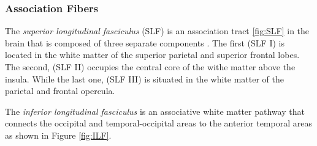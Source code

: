    \subsubsection*{Association Fibers}
   The \emph{superior longitudinal fasciculus} (SLF) is an association tract \ref{fig:SLF} in the brain that is composed of three separate components . The first (SLF I) is located in the white matter of the superior parietal and superior frontal lobes. The second, (SLF II) occupies the central core of the withe matter above the insula. While the last one, (SLF III) is situated in the white matter of the parietal and frontal opercula. \cite{10.1093/cercor/bhh186}

   The \emph{inferior longitudinal fasciculus} is an associative white matter pathway that connects the occipital and temporal-occipital areas to the anterior temporal areas as shown in Figure \ref{fig:ILF}. 

